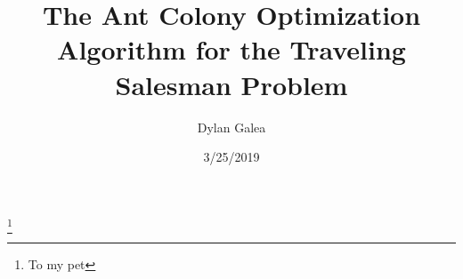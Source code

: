 \documentclass{amsbook}
\theoremstyle{definition}
\theoremstyle{remark}
\numberwithin{section}{chapter}
\numberwithin{equation}{chapter}
\begin{document}
\frontmatter

\title{The Ant Colony Optimization Algorithm for the Traveling Salesman Problem}


\author{Dylan Galea}
\thanks{To my pet}


\date{3/25/2019}

\maketitle


\setcounter{page}{5}

\tableofcontents

%

\mainmatter
%

\appendix
%

\backmatter

%

\printindex
\end{document}
